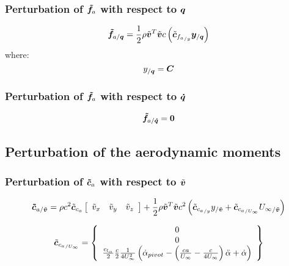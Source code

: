 \subsubsection{Perturbation of $\bm{\tilde{f}}_a$ with respect to $\bm{q}$}
\begin{equation}
\bm{\tilde{f}}_{a/\bm{q}} = 
	\frac{1}{2} \rho \tilde{\bm{v}}^T \tilde{\bm{v}} c
	\left(  \tilde{\bm{c}}_{{f_{a}}_{/y}} \bm{y}_{/\bm{q}}  \right) 
\end{equation}
where:
\begin{equation}
y_{/\bm{q}} = \bm{C} 
\end{equation}

\subsubsection{Perturbation of $\bm{\tilde{f}}_a$ with respect to $\bm{\dot{q}}$}
\begin{equation}
\bm{\tilde{f}}_{a/\bm{\dot{q}}} = \bm{0}
\end{equation}

\subsection{Perturbation of the aerodynamic moments}
\subsubsection{Perturbation of $\bm{\tilde{c}}_a$ with respect to $\tilde{\bm{v}}$}
		
\begin{equation}
\bm{\tilde{c}}_{a/\tilde{\bm{v}}} = 
	\rho c^2 \tilde{\bm{c}}_{c_{a}} \left[
		\begin{array}{ccc}
			\tilde{v}_x & \tilde{v}_y & \tilde{v}_z
		\end{array} \right] +
	\frac{1}{2} \rho \tilde{\bm{v}}^T \tilde{\bm{v}} c^2
	\left(  \tilde{\bm{c}}_{{c_{a}}_{/y}} y_{/\tilde{\bm{v}}} + 
	\tilde{\bm{c}}_{{c_{a}}_{/U_{\infty}}} {U_\infty}_{/\tilde{\bm{v}}}  \right) 
\end{equation}

\begin{equation}
\tilde{\bm{c}}_{{c_{a}}_{/U_{\infty}}} = \left\{
	\begin{array}{c}
		0 \\
		0 \\
		\frac{c_{l_{\alpha}}}{2} \frac{c}{2} \frac{1}{4 U_\infty^2} 
		\left(  \dot{\alpha}_{pivot} - \left(  \frac{c a}{U_\infty} - \frac{c}{4 U_\infty}  \right) \ddot{\alpha} + \dot{\alpha} \right)
	\end{array} \right\}
\end{equation}

